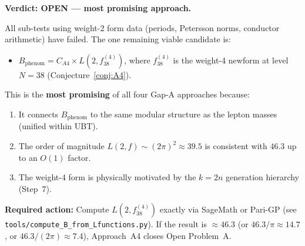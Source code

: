 \documentclass[12pt,a4paper]{article}
\theoremstyle{definition}
\theoremstyle{remark}
\begin{document}
\begin{gapbox}
\textbf{Verdict: OPEN --- most promising approach.}

All sub-tests using weight-2 form data (periods, Petersson norms, conductor
arithmetic) have failed.  The one remaining viable candidate is:
\begin{itemize}
  \item $B_{\mathrm{phenom}} = C_{A4} \times L(2, f_{38}^{(4)})$, where
        $f_{38}^{(4)}$ is the weight-4 newform at level $N = 38$
        (Conjecture~\ref{conj:A4}).
\end{itemize}

This is the \textbf{most promising} of all four Gap-A approaches because:
\begin{enumerate}
  \item It connects $B_{\mathrm{phenom}}$ to the same modular structure as
        the lepton masses (unified within UBT).
  \item The order of magnitude $L(2,f) \sim (2\pi)^2 \approx 39.5$ is
        consistent with $46.3$ up to an $O(1)$ factor.
  \item The weight-4 form is physically motivated by the $k = 2n$ generation
        hierarchy (Step~7).
\end{enumerate}

\textbf{Required action:} Compute $L(2, f_{38}^{(4)})$ exactly via SageMath
or Pari-GP (see \texttt{tools/compute\_B\_from\_Lfunctions.py}).  If the
result is $\approx 46.3$ (or $46.3/\pi \approx 14.7$, or $46.3/(2\pi) \approx 7.4$),
Approach~A4 closes Open Problem~A.
\end{gapbox}

\ifdefined\INCLUDEMODE
\else
  
\end{document}
